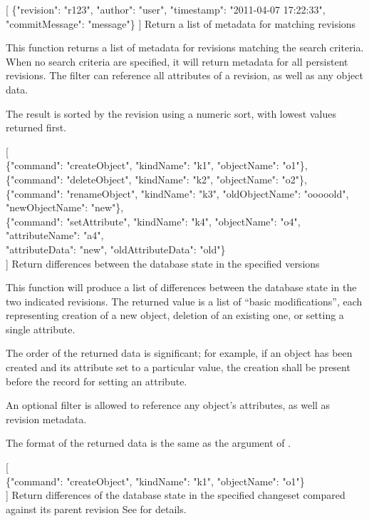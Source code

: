 \documentclass{article}
\begin{document}
    {[
    \{"revision": "r123", "author": "user", "timestamp": "2011-04-07 17:22:33", "commitMessage": "message"\}
    ]}
    {Return a list of metadata for matching revisions}
    {This function returns a list of metadata for revisions matching the search criteria.  When no search criteria are
    specified, it will return metadata for all persistent revisions.  The filter can reference all attributes of a
    revision, as well as any object data.

    The result is sorted by the revision using a numeric sort, with lowest values returned first.}

    {[ \\
    \{"command": "createObject", "kindName": "k1", "objectName": "o1"\}, \\
    \{"command": "deleteObject", "kindName": "k2", "objectName": "o2"\}, \\
    \{"command": "renameObject", "kindName": "k3", "oldObjectName": "ooooold", "newObjectName": "new"\}, \\
    \{"command": "setAttribute", "kindName": "k4", "objectName": "o4", "attributeName": "a4", \\
        "attributeData": "new", "oldAttributeData": "old"\} \\
    ]}
    {Return differences between the database state in the specified versions}
    {This function will produce a list of differences between the database state in the two indicated revisions.  The
    returned value is a list of ``basic modifications'', each representing creation of a new object, deletion of an
    existing one, or setting a single attribute.

    The order of the returned data is significant; for example, if an object has been created and its attribute set to a
    particular value, the creation shall be present before the record for setting an attribute.

    An optional filter is allowed to reference any object's attributes, as well as revision metadata.

    The format of the returned data is the same as the argument of .}

    {[ \\
    \{"command": "createObject", "kindName": "k1", "objectName": "o1"\} \\
    ]}
    {Return differences of the database state in the specified changeset compared against its parent revision}
    {See  for details.}
\end{document}
